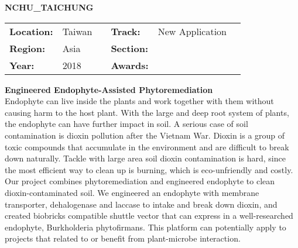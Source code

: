 \textbf{\uppercase{NCHU\_Taichung}}
\FloatBarrier
\begin{table}[h]
\begin{tabular}{lp{2.5cm}llll}
\textbf{Location:} & Taiwan & \multicolumn{1}{|l}{} & \textbf{Track:}   & New Application \\
\textbf{Region:}   & Asia   & \multicolumn{1}{|l}{} & \textbf{Section:} &  \\
\textbf{Year:}     & 2018   & \multicolumn{1}{|l}{} & \textbf{Awards:}  &
\end{tabular}
\end{table}
\FloatBarrier
\noindent	\textbf{Engineered Endophyte-Assisted Phytoremediation} \vspace{.2cm}\\
Endophyte can live inside the plants and work together with them without causing harm to the host plant. With the large and deep root system of plants, the endophyte can have further impact in soil. A serious case of soil contamination is dioxin pollution after the Vietnam War. Dioxin is a group of toxic compounds that accumulate in the environment and are difficult to break down naturally. Tackle with large area soil dioxin contamination is hard, since the most efficient way to clean up is burning, which is eco-unfriendly and costly. Our project combines phytoremediation and engineered endophyte to clean dioxin-contaminated soil. We engineered an endophyte with membrane transporter, dehalogenase and laccase to intake and break down dioxin, and created biobricks compatible shuttle vector that can express in a well-researched endophyte, Burkholderia phytofirmans. This platform can potentially apply to projects that related to or benefit from plant-microbe interaction.
\vspace{2cm}


